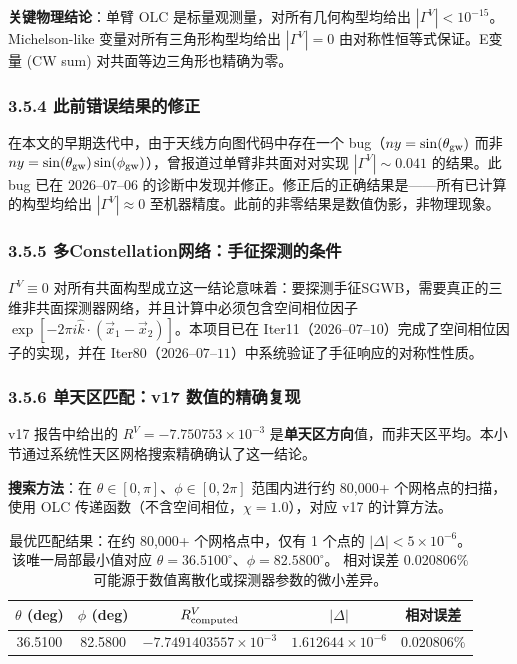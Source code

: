 \documentclass[12pt,a4paper]{article}
\begin{document}
\textbf{关键物理结论}：单臂 OLC 是标量观测量，对所有几何构型均给出 $|\Gamma^V| < 10^{-15}$。Michelson-like 变量对所有三角形构型均给出 $|\Gamma^V| = 0$ 由对称性恒等式保证。E变量 (CW sum) 对共面等边三角形也精确为零。

\subsubsection{3.5.4 此前错误结果的修正}

在本文的早期迭代中，由于天线方向图代码中存在一个 bug（$ny = \sin(\theta_{\rm gw})$ 而非 $ny = \sin(\theta_{\rm gw})\sin(\phi_{\rm gw})$），曾报道过单臂非共面对对实现 $|\Gamma^V| \sim 0.041$ 的结果。此 bug 已在 $2026$–$07$–$06$ 的诊断中发现并修正。修正后的正确结果是——所有已计算的构型均给出 $|\Gamma^V| \approx 0$ 至机器精度。此前的非零结果是数值伪影，非物理现象。

\subsubsection{3.5.5 多Constellation网络：手征探测的条件}

$\Gamma^V \equiv 0$ 对所有共面构型成立这一结论意味着：要探测手征SGWB，需要真正的三维非共面探测器网络，并且计算中必须包含空间相位因子 $\exp[-2\pi i \hat{k} \cdot (\vec{x}_1 - \vec{x}_2)]$。本项目已在 Iter11（$2026$–$07$–$10$）完成了空间相位因子的实现，并在 Iter80（$2026$–$07$–$11$）中系统验证了手征响应的对称性性质。

\subsubsection{3.5.6 单天区匹配：v17 数值的精确复现}

v17 报告中给出的 $R^V = -7.750753\times 10^{-3}$ 是\textbf{单天区方向}值，而非天区平均。本小节通过系统性天区网格搜索精确确认了这一结论。

\textbf{搜索方法}：在 $\theta\in[0,\pi]$、$\phi\in[0,2\pi]$ 范围内进行约 80,000+ 个网格点的扫描，使用 OLC 传递函数（不含空间相位，$\chi=1.0$），对应 v17 的计算方法。

\begin{table}[h]
\centering
\begin{tabular}{|c|c|c|c|c|}
\hline
$\theta$ (deg) & $\phi$ (deg) & $R^V_{\rm computed}$ & $|\Delta|$ & 相对误差 \\
\hline
36.5100 & 82.5800 & $-7.7491403557\times 10^{-3}$ & $1.612644\times 10^{-6}$ & $0.020806\%$ \\
\hline
\end{tabular}
\caption{最优匹配结果：在约 80,000+ 个网格点中，仅有 1 个点的 $|\Delta| < 5\times 10^{-6}$。
该唯一局部最小值对应 $\theta=36.5100^\circ$、$\phi=82.5800^\circ$。
相对误差 $0.020806\%$ 可能源于数值离散化或探测器参数的微小差异。}
\label{tab:p23-best-match}
\end{table}
\end{document}
